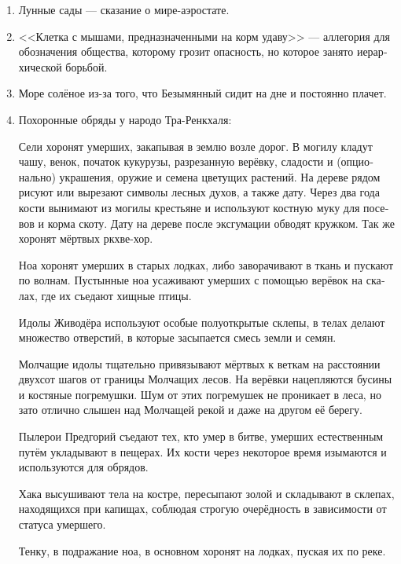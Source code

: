 \documentclass[a4paper,12pt,fleqn]{book}\usepackage{polyglossia}\setdefaultlanguage[babelshorthands=true]{russian}\setotherlanguage{english}\defaultfontfeatures{Ligatures=TeX,Mapping=tex-text}\usepackage{xcolor}\newcommand{\ml}[3]{#2}
\begin{document}
{\begin{enumerate}
<<Проблема неживых планет>> --- второй парадокс.
Почему жизнь не зарождается на всех планетах, ведь тогда плотность сознания была бы выше?
Парадокс был решён после разработки шкалы Яо.

\item Лунные сады --- сказание о мире-аэростате.

\item <<Клетка с мышами, предназначенными на корм удаву>> --- аллегория для обозначения общества, которому грозит опасность, но которое занято иерархической борьбой.

\item Море солёное из-за того, что Безымянный сидит на дне и постоянно плачет.

\item Похоронные обряды у народо Тра-Ренкхаля:

Сели хоронят умерших, закапывая в землю возле дорог.
В могилу кладут чашу, венок, початок кукурузы, разрезанную верёвку, сладости и (опционально) украшения, оружие и семена цветущих растений.
На дереве рядом рисуют или вырезают символы лесных духов, а также дату.
Через два года кости вынимают из могилы крестьяне и используют костную муку для посевов и корма скоту.
Дату на дереве после эксгумации обводят кружком.
Так же хоронят мёртвых ркхве-хор.

Ноа хоронят умерших в старых лодках, либо заворачивают в ткань и пускают по волнам.
Пустынные ноа усаживают умерших с помощью верёвок на скалах, где их съедают хищные птицы.

Идолы Живодёра используют особые полуоткрытые склепы, в телах делают множество отверстий, в которые засыпается смесь земли и семян.

Молчащие идолы тщательно привязывают мёртвых к веткам на расстоянии двухсот шагов от границы Молчащих лесов.
На верёвки нацепляются бусины и костяные погремушки.
Шум от этих погремушек не проникает в леса, но зато отлично слышен над Молчащей рекой и даже на другом её берегу.

Пылерои Предгорий съедают тех, кто умер в битве, умерших естественным путём укладывают в пещерах.
Их кости через некоторое время изымаются и используются для обрядов.

Хака высушивают тела на костре, пересыпают золой и складывают в склепах, находящихся при капищах, соблюдая строгую очерёдность в зависимости от статуса умершего.

Тенку, в подражание ноа, в основном хоронят на лодках, пуская их по реке.


\end{enumerate}}
\end{document}
